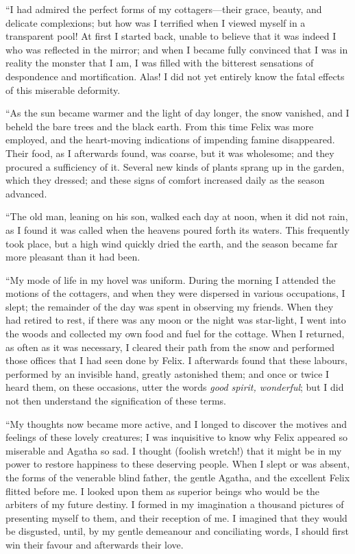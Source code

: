 \documentclass[12pt,openright]{book}
\begin{document}
“I had admired the perfect forms of my cottagers—their grace, beauty, and delicate complexions; but how was I terrified when I viewed myself in a transparent pool! At first I started back, unable to believe that it was indeed I who was reflected in the mirror; and when I became fully convinced that I was in reality the monster that I am, I was filled with the bitterest sensations of despondence and mortification. Alas! I did not yet entirely know the fatal effects of this miserable deformity.

“As the sun became warmer and the light of day longer, the snow vanished, and I beheld the bare trees and the black earth. From this time Felix was more employed, and the heart-moving indications of impending famine disappeared. Their food, as I afterwards found, was coarse, but it was wholesome; and they procured a sufficiency of it. Several new kinds of plants sprang up in the garden, which they dressed; and these signs of comfort increased daily as the season advanced.

“The old man, leaning on his son, walked each day at noon, when it did not rain, as I found it was called when the heavens poured forth its waters. This frequently took place, but a high wind quickly dried the earth, and the season became far more pleasant than it had been.

“My mode of life in my hovel was uniform. During the morning I attended the motions of the cottagers, and when they were dispersed in various occupations, I slept; the remainder of the day was spent in observing my friends. When they had retired to rest, if there was any moon or the night was star-light, I went into the woods and collected my own food and fuel for the cottage. When I returned, as often as it was necessary, I cleared their path from the snow and performed those offices that I had seen done by Felix. I afterwards found that these labours, performed by an invisible hand, greatly astonished them; and once or twice I heard them, on these occasions, utter the words \textit{good}\textit{ }\textit{spirit, wonderful}; but I did not then understand the signification of these terms.

“My thoughts now became more active, and I longed to discover the motives and feelings of these lovely creatures; I was inquisitive to know why Felix appeared so miserable and Agatha so sad. I thought (foolish wretch!) that it might be in my power to restore happiness to these deserving people. When I slept or was absent, the forms of the venerable blind father, the gentle Agatha, and the excellent Felix flitted before me. I looked upon them as superior beings who would be the arbiters of my future destiny. I formed in my imagination a thousand pictures of presenting myself to them, and their reception of me. I imagined that they would be disgusted, until, by my gentle demeanour and conciliating words, I should first win their favour and afterwards their love.
\end{document}
